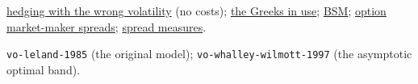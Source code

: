 \begin{qfmethod}
 \hyperref[res:delta-hedging-volatility-mismatch]{hedging with the wrong volatility} (no costs); \hyperref[meth:greeks-delta-gamma-hedging]{the Greeks in use}; \hyperref[mod:black-scholes-merton]{BSM}; \hyperref[res:option-market-maker-spreads]{option market-maker spreads}; \hyperref[def:spread-measures]{spread measures}.

 \nolinkurl{vo-leland-1985} (the original model); \nolinkurl{vo-whalley-wilmott-1997} (the asymptotic optimal band).

\end{qfmethod}
